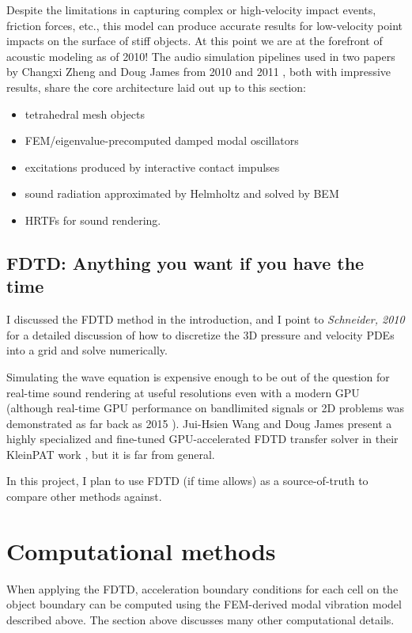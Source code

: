 \documentclass[12pt]{article}
\begin{document}
Despite the limitations in capturing complex or high-velocity impact events, friction forces, etc., this model can produce accurate results for low-velocity point impacts on the surface of stiff objects.
At this point we are at the forefront of acoustic modeling as of 2010!
The audio simulation pipelines used in two papers by Changxi Zheng and Doug James from 2010 and 2011 \cite{zheng_rigid_body_fracture_2010, zheng_modal_contact_2011}, both with impressive results, share the core architecture laid out up to this section:
\begin{itemize}
    \item tetrahedral mesh objects
    \item FEM/eigenvalue-precomputed damped modal oscillators
    \item excitations produced by interactive contact impulses
    \item sound radiation approximated by Helmholtz and solved by BEM
    \item HRTFs for sound rendering.
\end{itemize}

\subsection{FDTD: Anything you want if you have the time}

I discussed the FDTD method in the introduction, and I point to \textit{Schneider, 2010} \cite{schneider_fdtd_2010} for a detailed discussion of how to discretize the 3D pressure and velocity PDEs into a grid and solve numerically.

Simulating the wave equation is expensive enough to be out of the question for real-time sound rendering at useful resolutions even with a modern GPU (although real-time GPU performance on bandlimited signals or 2D problems was demonstrated as far back as 2015 \cite{allen_aerophones_2015}).
Jui-Hsien Wang and Doug James present a highly specialized and fine-tuned GPU-accelerated FDTD transfer solver in their KleinPAT work \cite{wang_kleinpat_2019}, but it is far from general.

In this project, I plan to use FDTD (if time allows) as a source-of-truth to compare other methods against.

\section{Computational methods}

When applying the FDTD, acceleration boundary conditions for each cell on the object boundary can be computed using the FEM-derived modal vibration model described above.
The section above discusses many other computational details.
\end{document}
